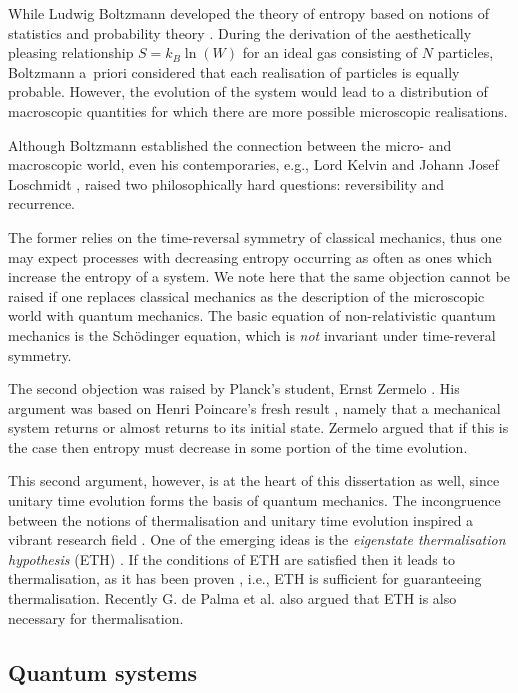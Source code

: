 \documentclass[a4paper, 10pt]{article}
\theoremstyle{plain}
\begin{document}
While Ludwig Boltzmann developed the theory of entropy based on notions of
statistics and probability theory \cite{Boltzmann1872, BoltzmannReprint2011,
Mueller2007}. During the derivation of the aesthetically pleasing relationship
$S = k_{B} \ln{\!(W)}$ for an ideal gas consisting of $N$ particles, Boltzmann
a~priori considered that each realisation of particles is equally probable.
However, the evolution of the system would lead to a distribution of macroscopic
quantities for which there are more possible microscopic realisations.

Although Boltzmann established the connection between the micro- and macroscopic
world, even his contemporaries, e.g., Lord Kelvin \cite{Thomson1875,
Thomson1874} and Johann Josef Loschmidt \cite{Mueller2007}, raised two
philosophically hard questions: reversibility and recurrence.

The former relies on the time-reversal symmetry of classical mechanics, thus one
may expect processes with decreasing entropy occurring as often as ones which
increase the entropy of a system. We note here that the same objection cannot be
raised if one replaces classical mechanics as the description of the microscopic
world with quantum mechanics. The basic equation of non-relativistic quantum
mechanics is the Sch{\"o}dinger equation, which is {\emph{not}} invariant under
time-reveral symmetry.

The second objection was raised by Planck's student, Ernst Zermelo
\cite{Zermelo1896, Zermelo2013}. His argument was based on Henri Poincare's
fresh result \cite{Poincare1890, Poincare2017}, namely that a mechanical system
returns or almost returns to its initial state. Zermelo argued that if this is
the case then entropy must decrease in some portion of the time evolution.

This second argument, however, is at the heart of this dissertation as well,
since unitary time evolution forms the basis of quantum mechanics. The
incongruence between the notions of thermalisation and unitary time evolution
inspired a vibrant research field \cite{Calabrese2006, Cazalilla2006, Rigol2007,
Palma2015}. One of the emerging ideas is the {\emph{eigenstate thermalisation
hypothesis}} (ETH) \cite{}. If the conditions of ETH are satisfied then it leads
to thermalisation, as it has been proven \cite{}, i.e., ETH is sufficient for
guaranteeing thermalisation. Recently G. de Palma et al. also argued
\cite{Palma2015} that ETH is also necessary for thermalisation.


\subsection{Quantum systems}
\end{document}
